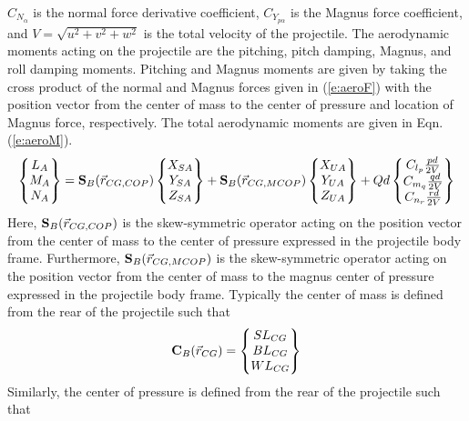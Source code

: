 $C_{N_\alpha}$ is the normal force derivative coefficient,
$C_{Y_{p\alpha}}$ is the Magnus force coefficient, and
$V=\sqrt{u^2+v^2+w^2}$ is the total velocity of the projectile. 
The aerodynamic moments acting on the projectile are the pitching,
pitch damping, Magnus, and roll damping moments. Pitching and Magnus
moments are given by taking the cross product of the normal and Magnus
forces given in (\ref{e:aeroF})  with the position vector from the
center of mass to the center of pressure and location of Magnus force,
respectively. The total aerodynamic moments are given in
Eqn. (\ref{e:aeroM}). 
\begin{equation}\label{e:aeroM}
\begin{Bmatrix} L_A \\ M_A \\ N_A \end{Bmatrix}=
{\bf S}_B(\vec{r}_{CG,COP})\begin{Bmatrix}
  X_{SA} \\ Y_{SA}\\ Z_{SA} \end{Bmatrix} + {\bf S}_B(\vec{r}_{CG,MCOP})\begin{Bmatrix}
  X_{UA} \\ Y_{UA}\\ Z_{UA} \end{Bmatrix} + 
Qd \begin{Bmatrix}
C_{l_p} \frac{pd}{2V} \\
C_{m_q} \frac{qd}{2V}\\
C_{n_r} \frac{rd}{2V} \end{Bmatrix}
\end{equation}
Here, ${\bf S}_B(\vec{r}_{CG,COP})$ is the skew-symmetric operator
acting on the position vector from the center of mass to the center of
pressure expressed in the projectile body frame. Furthermore, ${\bf S}_B(\vec{r}_{CG,MCOP})$ is the skew-symmetric operator
acting on the position vector from the center of mass to the magnus
center of pressure expressed in the projectile body frame. Typically
the center of mass is defined from the rear of the projectile such
that 
\begin{equation}
{\bf C}_B(\vec{r}_{CG}) = \begin{Bmatrix} SL_{CG} \\ BL_{CG} \\ WL_{CG} \end{Bmatrix}
\end{equation}
Similarly, the center of pressure is defined from the rear of the
projectile such that
